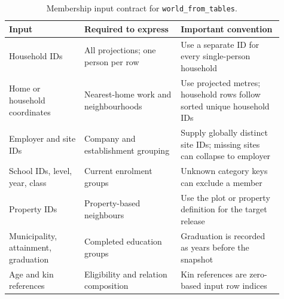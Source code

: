\begin{table}[!htbp]
\centering\small
\caption{Membership input contract for \texttt{world\_from\_tables}.}
\label{tab:inputs}
\begin{tabular}{@{} >{\raggedright\arraybackslash}p{0.25\linewidth} >{\raggedright\arraybackslash}p{0.32\linewidth} >{\raggedright\arraybackslash}p{0.34\linewidth} @{}}
\toprule
\rowcolor{tableblue} \textbf{Input} & \textbf{Required to express} & \textbf{Important convention} \\
\midrule
Household IDs & All projections; one person per row & Use a separate ID for every single-person household \\
Home or household coordinates & Nearest-home work and neighbourhoods & Use projected metres; household rows follow sorted unique household IDs \\
Employer and site IDs & Company and establishment grouping & Supply globally distinct site IDs; missing sites can collapse to employer \\
School IDs, level, year, class & Current enrolment groups & Unknown category keys can exclude a member \\
Property IDs & Property-based neighbours & Use the plot or property definition for the target release \\
Municipality, attainment, graduation & Completed education groups & Graduation is recorded as years before the snapshot \\
Age and kin references & Eligibility and relation composition & Kin references are zero-based input row indices \\
\bottomrule
\end{tabular}
\end{table}
